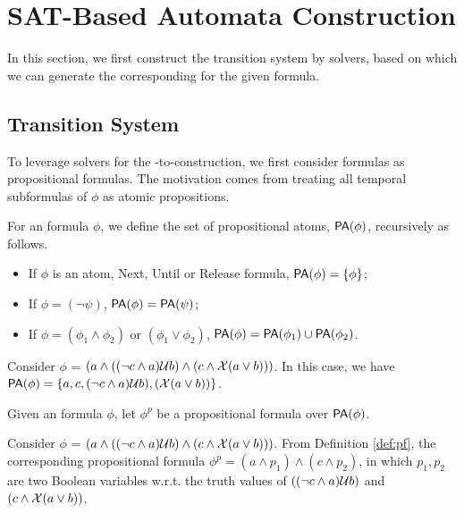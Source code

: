 \section{SAT-Based Automata Construction}

In this section, we first construct the \ltlf transition system by \SAT solvers, based on which we can generate the corresponding \NFA for the given \ltlf formula. 

\subsection{\ltlf Transition System}

To leverage \SAT solvers for the \ltlf-to-\NFA construction, we first consider \ltlf formulas as propositional formulas. The motivation comes from treating all temporal subformulas of $\phi$ as atomic propositions. 

\begin{definition}\label{def:pa}
For an \ltlf formula $\phi$, we define the set of propositional atoms, ${\sf PA}(\phi)$, recursively as follows.
\begin{itemize}
	\item If $\phi$ is an atom, Next, Until or Release formula, ${\sf PA}(\phi)=\{\phi\}$;
	\item If $\phi = (\neg \psi)$, ${\sf PA}(\phi)= {\sf PA}(\psi)$;
	\item If $\phi = (\phi_1 \wedge \phi_2)$ or $(\phi_1 \vee \phi_2)$, ${\sf PA}(\phi) = {\sf PA}(\phi_1) \cup {\sf PA}(\phi_2)$.
\end{itemize}
\end{definition}

Consider $\phi$ = $(a \wedge ((\neg c \wedge a)\mathcal{U} b) \wedge (c \wedge \mathcal{X} (a \vee b)))$. In this case, we have ${\sf PA}(\phi)=\{a, c, (\neg c \wedge a)\mathcal{U} b), (\mathcal{X} (a \vee b))\}$. 

\begin{definition}\label{def:pf}
Given an \ltlf formula $\phi$, let $\phi^{p}$ be a propositional formula over ${\sf PA}(\phi)$. 
\end{definition}

Consider $\phi$ = $(a \wedge ((\neg c \wedge a)\mathcal{U} b) \wedge (c \wedge \mathcal{X} (a \vee b)))$. From Definition \ref{def:pf}, the corresponding propositional formula $\phi^p = (a \wedge p_1) \wedge (c \wedge p_2)$, in which $p_1, p_2$ are two Boolean variables w.r.t. the truth values of $((\neg c \wedge a)\mathcal{U} b)$ and $(c \wedge \mathcal{X} (a \vee b))$. 

